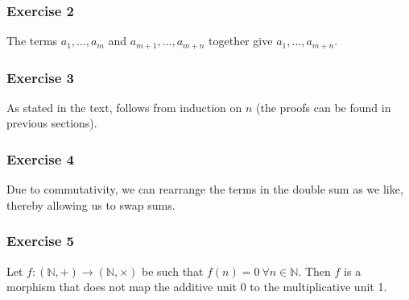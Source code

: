 \subsubsection{Exercise 2}
The terms $a_1, ..., a_m$ and $a_{m+1}, ..., a_{m+n}$ together give $a_1, ..., a_{m + n}$.

\subsubsection{Exercise 3}
As stated in the text, follows from induction on $n$ (the proofs can be found in previous sections).

\subsubsection{Exercise 4}
Due to commutativity, we can rearrange the terms in the double sum as we like, thereby allowing us
to swap sums.

\subsubsection{Exercise 5}
Let $f: (\mathbb{N}, +) \to (\mathbb{N}, \times)$ be such that $f(n) = 0 \:  \forall n \in \mathbb{N}$.
Then $f$ is a morphism that does not map the additive unit 0 to the multiplicative unit 1.
